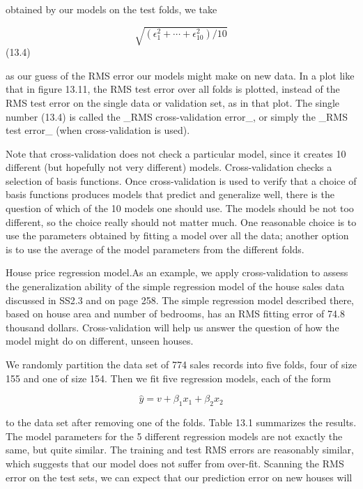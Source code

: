 obtained by our models on the test folds, we take

\[\sqrt{(\epsilon_{1}^{2}+\cdots+\epsilon_{10}^{2})/10}\] (13.4)

as our guess of the RMS error our models might make on new data. In a plot like that in figure 13.11, the RMS test error over all folds is plotted, instead of the RMS test error on the single data or validation set, as in that plot. The single number (13.4) is called the _RMS cross-validation error_, or simply the _RMS test error_ (when cross-validation is used).

Note that cross-validation does not check a particular model, since it creates 10 different (but hopefully not very different) models. Cross-validation checks a selection of basis functions. Once cross-validation is used to verify that a choice of basis functions produces models that predict and generalize well, there is the question of which of the 10 models one should use. The models should be not too different, so the choice really should not matter much. One reasonable choice is to use the parameters obtained by fitting a model over all the data; another option is to use the average of the model parameters from the different folds.

House price regression model.As an example, we apply cross-validation to assess the generalization ability of the simple regression model of the house sales data discussed in SS2.3 and on page 258. The simple regression model described there, based on house area and number of bedrooms, has an RMS fitting error of 74.8 thousand dollars. Cross-validation will help us answer the question of how the model might do on different, unseen houses.

We randomly partition the data set of 774 sales records into five folds, four of size 155 and one of size 154. Then we fit five regression models, each of the form

\[\hat{y}=v+\beta_{1}x_{1}+\beta_{2}x_{2}\]

to the data set after removing one of the folds. Table 13.1 summarizes the results. The model parameters for the 5 different regression models are not exactly the same, but quite similar. The training and test RMS errors are reasonably similar, which suggests that our model does not suffer from over-fit. Scanning the RMS error on the test sets, we can expect that our prediction error on new houses will

